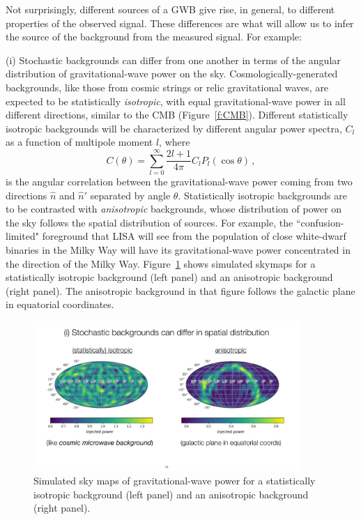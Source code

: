 \documentclass[11pt]{article}
\numberwithin{equation}{section}
\def\be{\begin{equation}}
\def\ee{\end{equation}}
\begin{document}
Not surprisingly, different sources of a GWB give
rise, in general, to different properties of the 
observed signal.
These differences are what will allow us to infer 
the source of the background from the measured signal.
For example:

(i) Stochastic backgrounds can differ from one another 
in terms of the angular distribution of 
gravitational-wave power on the sky.
Cosmologically-generated backgrounds, like those from 
cosmic strings or relic gravitational waves,
are expected to be statistically {\em isotropic},
with equal gravitational-wave power in all different
directions, similar to the CMB (Figure~\ref{f:CMB}).
Different statistically isotropic backgrounds will
be characterized by different angular power spectra,
$C_l$ as a function of multipole moment $l$, where
%
\be
C(\theta) = \sum_{l=0}^\infty \frac{2l+1}{4\pi} 
C_l P_l(\cos\theta)\,,
\ee
%
is the angular correlation between the gravitational-wave
power coming from two directions $\hat n$ and $\hat n'$
separated by angle $\theta$.
Statistically isotropic backgrounds are to be contrasted
with {\em anisotropic} backgrounds, whose distribution of
power on the sky follows the spatial distribution of 
sources.
For example, the ``confusion-limited" foreground that 
LISA will see from the population of close white-dwarf 
binaries in the Milky Way will have its gravitational-wave 
power concentrated in the direction of the Milky Way.
Figure~\ref{f:statiso-vs-aniso} shows simulated skymaps 
for a statistically isotropic background (left panel) and an
anisotropic background (right panel). 
The anisotropic background in that figure follows the
galactic plane in equatorial coordinates. 
%
\begin{figure}[htbp!]
\begin{center}
\includegraphics[width=0.9\textwidth]{Figures/statiso-vs-aniso}
\caption{Simulated sky maps of gravitational-wave power
for a statistically isotropic background (left panel) and an 
anisotropic background (right panel).}
\label{f:statiso-vs-aniso}
\end{center}
\end{figure}
%
\end{document}
